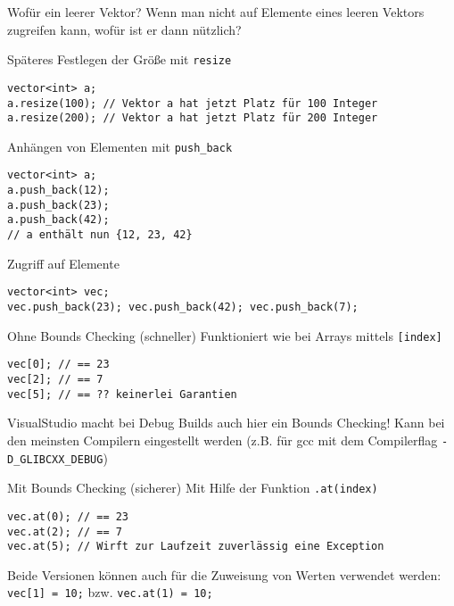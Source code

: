 \documentclass[presentation]{beamer}
\begin{document}
\begin{frame}[label={sec:orga94e429},fragile]{Wofür ein leerer Vektor?}
 Wenn man nicht auf Elemente eines leeren Vektors zugreifen kann, wofür
ist er dann nützlich?
\begin{exampleblock}{Späteres Festlegen der Größe mit {\color{solarizedYellow}\texttt{resize}}}
\begin{verbatim}
vector<int> a;
a.resize(100); // Vektor a hat jetzt Platz für 100 Integer
a.resize(200); // Vektor a hat jetzt Platz für 200 Integer
\end{verbatim}
\end{exampleblock}
\begin{exampleblock}{Anhängen von Elementen mit {\color{solarizedYellow}\texttt{push\_back}}}
\begin{verbatim}
vector<int> a;
a.push_back(12);
a.push_back(23);
a.push_back(42);
// a enthält nun {12, 23, 42}
\end{verbatim}
\end{exampleblock}
\end{frame}
\begin{frame}[label={sec:org6255dad},fragile]{Zugriff auf Elemente}
 \begin{verbatim}
vector<int> vec;
vec.push_back(23); vec.push_back(42); vec.push_back(7);
\end{verbatim}
\begin{block}{Ohne Bounds Checking (schneller)}
Funktioniert wie bei Arrays mittels {\color{solarizedYellow}\verb![index]!}
\begin{verbatim}
vec[0]; // == 23
vec[2]; // == 7
vec[5]; // == ?? keinerlei Garantien
\end{verbatim}
\tiny VisualStudio macht bei Debug Builds auch hier ein Bounds
Checking! Kann bei den meinsten Compilern eingestellt werden (z.B. für
gcc mit dem Compilerflag {\color{solarizedYellow}\verb!-D_GLIBCXX_DEBUG!})
\end{block}
\begin{block}{Mit Bounds Checking (sicherer)}
Mit Hilfe der Funktion {\color{solarizedYellow}\verb!.at(index)!}
\begin{verbatim}
vec.at(0); // == 23
vec.at(2); // == 7
vec.at(5); // Wirft zur Laufzeit zuverlässig eine Exception
\end{verbatim}
\end{block}
Beide Versionen können auch für die Zuweisung von Werten verwendet
werden: {\color{solarizedYellow}\verb!vec[1] = 10;!} bzw. {\color{solarizedYellow}\verb!vec.at(1) = 10;!}
\end{frame}
\end{document}
